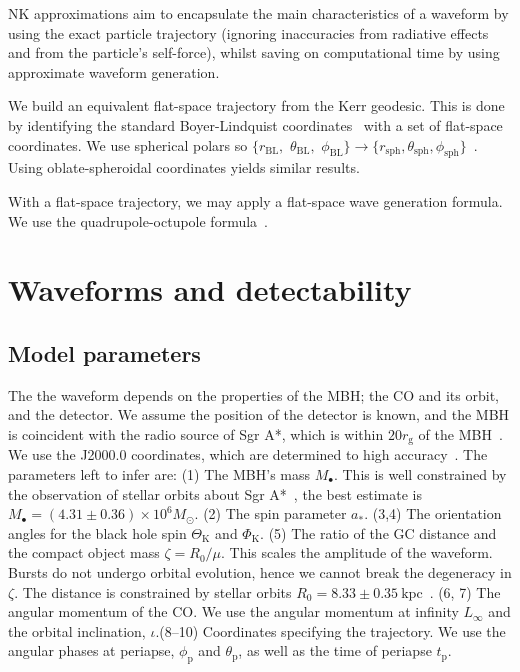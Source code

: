 \documentclass[11pt,twoside]{article}
\begin{document}
NK approximations aim to encapsulate the main characteristics of a waveform by using the exact particle trajectory (ignoring inaccuracies from radiative effects and from the particle's self-force), whilst saving on computational time by using approximate waveform generation.

We build an equivalent flat-space trajectory from the Kerr geodesic. This is done by identifying the standard Boyer-Lindquist coordinates~\citep{Boyer1967} with a set of flat-space coordinates. We use spherical polars so $\{r_\mathrm{BL},$ $\theta_\mathrm{BL},$ $\phi_\mathrm{BL}\} \rightarrow \{r_\mathrm{sph}, \theta_\mathrm{sph}, \phi_\mathrm{sph}\}$~\citep*{Gair2005}. Using oblate-spheroidal coordinates yields similar results.

With a flat-space trajectory, we may apply a flat-space wave generation formula. We use the quadrupole-octupole formula~\citep{Bekenstein1973, Press1977, Yunes2008}.  

\section{Waveforms and detectability}\label{sec:Waveforms}

\subsection{Model parameters}

The the waveform depends on the properties of the MBH; the CO and its orbit, and the detector. We assume the position of the detector is known, and the MBH is coincident with the radio source of Sgr A*, which is within $20 r_\mathrm{g}$ of the MBH~\citep{Reid2003,Doeleman2008}. We use the J2000.0 coordinates, which are determined to high accuracy~\citep{Reid1999, Yusef-Zadeh1999}. The parameters left to infer are: (1) The MBH's mass $M_\bullet$. This is well constrained by the observation of stellar orbits about Sgr A*~\citep{Ghez2008, Gillessen2009}, the best estimate is $M_\bullet = (4.31 \pm 0.36) \times 10^6 M_\odot$. (2) The spin parameter $a_\ast$. (3,4) The orientation angles for the black hole spin $\Theta_\mathrm{K}$ and $\Phi_\mathrm{K}$. (5) The ratio of the GC distance and the compact object mass $\zeta = R_0/\mu$. This scales the amplitude of the waveform. Bursts do not undergo orbital evolution, hence we cannot break the degeneracy in $\zeta$. The distance is constrained by stellar orbits $R_0 = 8.33 \pm 0.35~\mathrm{kpc}$~\citep{Gillessen2009}. (6, 7) The angular momentum of the CO. We use the angular momentum at infinity $L_\infty$ and the orbital inclination, $\iota$.(8--10) Coordinates specifying the trajectory. We use the angular phases at periapse, $\phi_\mathrm{p}$ and $\theta_\mathrm{p}$, as well as the time of periapse $t_\mathrm{p}$.
\end{document}
